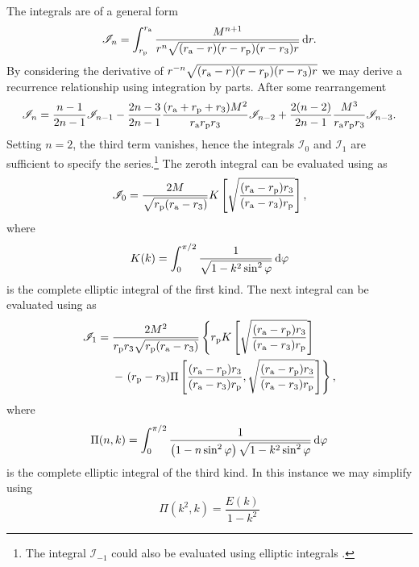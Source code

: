 The integrals are of a general form
\begin{equation}
\mathscr{I}_n = \int_{r_\mathrm{p}}^{r_\mathrm{a}}{\dfrac{M^{n+1}}{r^n\sqrt{(r_\mathrm{a} - r)(r - r_\mathrm{p})(r - r_3)r}}}\,\mathrm{d}{r}.
\end{equation}
By considering the derivative of $r^{-n}\sqrt{(r_\mathrm{a} - r)(r - r_\mathrm{p})(r - r_3)r}$ we may derive a recurrence relationship using integration by parts. After some rearrangement
\begin{equation}
\mathscr{I}_n = \dfrac{n - 1}{2n - 1}\mathscr{I}_{n-1} - \dfrac{2n - 3}{2n - 1} \dfrac{(r_\mathrm{a} + r_\mathrm{p} + r_3)M^2}{r_\mathrm{a}r_\mathrm{p}r_3}\mathscr{I}_{n-2} + \dfrac{2(n - 2)}{2n-1}\dfrac{M^3}{r_\mathrm{a}r_\mathrm{p}r_3}\mathscr{I}_{n-3}.
\end{equation}
Setting $n = 2$, the third term vanishes, hence the integrals $\mathscr{I}_0$ and $\mathscr{I}_1$ are sufficient to specify the series.\footnote{The integral $\mathscr{I}_{-1}$ could also be evaluated using elliptic integrals \citep[3.148.6]{Gradshteyn2000}.} The zeroth integral can be evaluated using \citet[3.147.6]{Gradshteyn2000} as
\begin{equation}
\mathscr{I}_0 = \dfrac{2M}{\sqrt{r_\mathrm{p}(r_\mathrm{a} - r_3)}}K\left[\sqrt{\dfrac{(r_\mathrm{a} - r_\mathrm{p})r_3}{(r_\mathrm{a} - r_3)r_\mathrm{p}}}\right],
\end{equation}
where
\begin{equation}
K(k) = \int_{0}^{\pi/2}{\frac{1}{\sqrt{1 - k^2 \sin^2\varphi}}}\,\mathrm{d}{\varphi}
\end{equation}
is the complete elliptic integral of the first kind. The next integral can be evaluated using \citet[3.149.6]{Gradshteyn2000} as
\begin{align}
\mathscr{I}_1 = {} & \dfrac{2M^2}{r_\mathrm{p}r_3\sqrt{r_\mathrm{p}(r_\mathrm{a} - r_3)}}\left\{r_\mathrm{p}K\left[\sqrt{\dfrac{(r_\mathrm{a} - r_\mathrm{p})r_3}{(r_\mathrm{a} - r_3)r_\mathrm{p}}}\right]\right. \nonumber \\*
 {} & - \left.(r_\mathrm{p} - r_3)\Pi\left[\dfrac{(r_\mathrm{a} - r_\mathrm{p})r_3}{(r_\mathrm{a} - r_3)r_\mathrm{p}}, \sqrt{\dfrac{(r_\mathrm{a} - r_\mathrm{p})r_3}{(r_\mathrm{a} - r_3)r_\mathrm{p}}}\right]\right\},
\end{align}
where
\begin{equation}
\Pi(n,k) = \int_{0}^{\pi/2}{\frac{1}{\left(1 - n \sin^2\varphi\right)\sqrt{1 - k^2 \sin^2\varphi}}}\,\mathrm{d}{\varphi}
\end{equation}
is the complete elliptic integral of the third kind. In this instance we may simplify using \citet[19.6.2]{Olver2010}
\begin{equation}
\Pi(k^2,k) = \dfrac{E(k)}{1 - k^2}
\end{equation}
